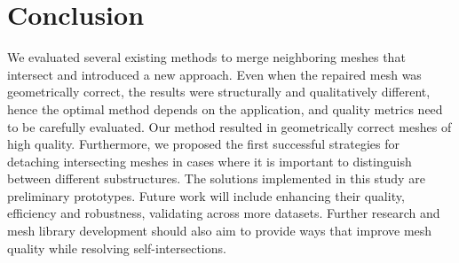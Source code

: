 \section{Conclusion}


We evaluated several existing methods to merge neighboring meshes that intersect and introduced a new approach. Even when the repaired mesh was geometrically correct, the results were structurally and qualitatively different, hence the optimal method depends on the application, and quality metrics need to be carefully evaluated. Our method resulted in geometrically correct meshes of high quality. Furthermore, we proposed the first successful strategies for detaching intersecting meshes in cases where it is important to distinguish between different substructures. 
The solutions implemented in this study are preliminary prototypes. Future work will include enhancing their quality, efficiency and robustness, validating across more datasets. Further research and mesh library development should also aim to provide ways that improve mesh quality while resolving self-intersections.



